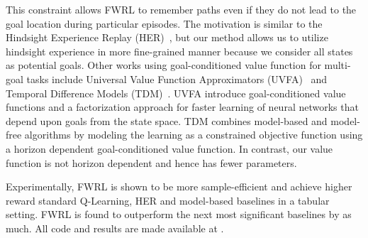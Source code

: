 This constraint allows FWRL to remember paths even if they do not lead to the goal
location during particular episodes. The motivation is similar to the Hindsight
Experience Replay (HER)~\citep{anderson2017vision}, but our method allows us to
utilize hindsight experience in more fine-grained manner because we consider all
states as potential goals. Other works using goal-conditioned value function for
multi-goal tasks include Universal Value Function Approximators
(UVFA)~\citep{schaul2015universal} and Temporal Difference Models
(TDM)~\citep{pong2018temporal}. UVFA introduce goal-conditioned value functions
and a factorization approach for faster learning of neural networks that depend
upon goals from the state space. TDM combines model-based and model-free
algorithms by modeling the learning as a constrained objective function using a
horizon dependent goal-conditioned value function. In contrast, our value
function is not horizon dependent and hence has fewer parameters.


Experimentally, FWRL is shown to be more sample-efficient and achieve
higher reward standard Q-Learning, HER and model-based baselines in a
tabular setting.  FWRL is found to outperform the next most significant
baselines by as much. All code and results are made available at
\href{}{}. 





